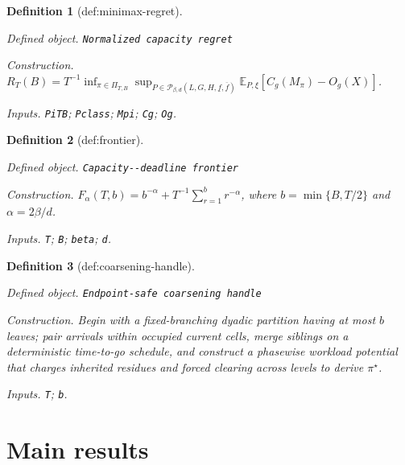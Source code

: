 \documentclass{article}
\newtheorem{definition}{Definition}
\begin{document}
\begin{definition}[def:minimax-regret]\label{def:minimax-regret}
\par\smallskip\noindent\emph{Defined object.} \texttt{Normalized capacity regret}
\par\smallskip\noindent\emph{Construction.} \(R_T(B)=T^{-1}\inf_{\pi\in\Pi_{T,B}}\sup_{P\in\mathcal P_{\beta,d}(L,G,H,\underline f,\overline f)}\mathbb E_{P,\xi}[C_g(M_\pi)-O_g(X)]\).
\par\smallskip\noindent\emph{Inputs.} \texttt{PiTB}; \texttt{Pclass}; \texttt{Mpi}; \texttt{Cg}; \texttt{Og}.
\end{definition}

\begin{definition}[def:frontier]\label{def:frontier}
\par\smallskip\noindent\emph{Defined object.} \texttt{Capacity-\allowbreak{}-\allowbreak{}deadline frontier}
\par\smallskip\noindent\emph{Construction.} \(F_\alpha(T,b)=b^{-\alpha}+T^{-1}\sum_{r=1}^{b}r^{-\alpha}\), where \(b=\min\{B,T/2\}\) and \(\alpha=2\beta/d\).
\par\smallskip\noindent\emph{Inputs.} \texttt{T}; \texttt{B}; \texttt{beta}; \texttt{d}.
\end{definition}

\begin{definition}[def:coarsening-handle]\label{def:coarsening-handle}
\par\smallskip\noindent\emph{Defined object.} \texttt{Endpoint-\allowbreak{}safe coarsening handle}
\par\smallskip\noindent\emph{Construction.} Begin with a fixed-branching dyadic partition having at most \(b\) leaves; pair arrivals within occupied current cells, merge siblings on a deterministic time-to-go schedule, and construct a phasewise workload potential that charges inherited residues and forced clearing across levels to derive \(\pi^\star\).
\par\smallskip\noindent\emph{Inputs.} \texttt{T}; \texttt{b}.
\end{definition}

\section{Main results}
\end{document}
